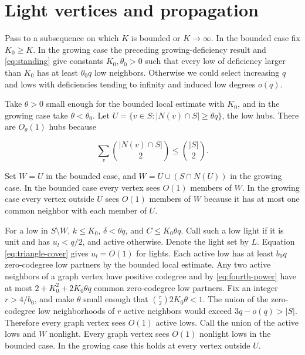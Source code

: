 \documentclass[11pt,reqno]{amsart}
\theoremstyle{definition}
\theoremstyle{remark}
\numberwithin{equation}{section}
\begin{document}
\section{Light vertices and propagation}\label{sec:light}

Pass to a subsequence on which \(K\) is bounded or \(K\to\infty\). In the bounded case fix \(K_0\ge K\). In the growing case the preceding growing-deficiency result and \eqref{eq:standing} give constants \(K_0,\theta_0>0\) such that every low of deficiency larger than \(K_0\) has at least \(\theta_0q\) low neighbors. Otherwise we could select increasing \(q\) and lows with deficiencies tending to infinity and induced low degrees \(o(q)\).

Take \(\theta>0\) small enough for the bounded local estimate with \(K_0\), and in the growing case take \(\theta<\theta_0\). Let \(U=\{v\in S:|N(v)\cap S|\ge\theta q\}\), the low hubs. There are \(O_\theta(1)\) hubs because

\begin{equation}\label{eq:low-pairs}
\sum_v\binom{|N(v)\cap S|}{2}\le\binom{|S|}{2}.
\end{equation}

Set \(W=U\) in the bounded case, and \(W=U\cup(S\cap N(U))\) in the growing case. In the bounded case every vertex sees \(O(1)\) members of \(W\). In the growing case every vertex outside \(U\) sees \(O(1)\) members of \(W\) because it has at most one common neighbor with each member of \(U\).

For a low in \(S\setminus W\), \(k\le K_0\), \(\delta<\theta q\), and \(C\le K_0\theta q\). Call such a low light if it is unit and has \(u_l<q/2\), and active otherwise. Denote the light set by \(L\). Equation \eqref{eq:triangle-cover} gives \(u_l=O(1)\) for lights. Each active low has at least \(b_0 q\) zero-codegree low partners by the bounded local estimate. Any two active neighbors of a graph vertex have positive codegree and by \eqref{eq:fourth-power} have at most \(2+K_0^2+2K_0\theta q\) common zero-codegree low partners. Fix an integer \(r>4/b_0\), and make \(\theta\) small enough that \(\binom r2 2K_0\theta<1\). The union of the zero-codegree low neighborhoods of \(r\) active neighbors would exceed \(3q-o(q)>|S|\). Therefore every graph vertex sees \(O(1)\) active lows. Call the union of the active lows and \(W\) nonlight. Every graph vertex sees \(O(1)\) nonlight lows in the bounded case. In the growing case this holds at every vertex outside \(U\).
\end{document}
